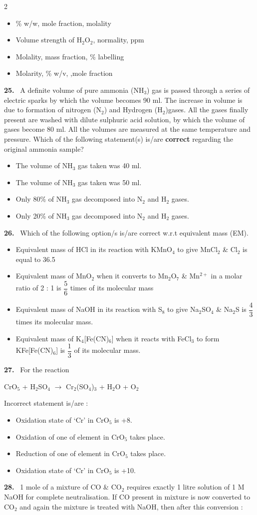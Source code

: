 \documentclass[10pt]{extarticle}
\newcommand{\qn}[1]{\par\smallskip\noindent\textbf{#1.}~}
\newenvironment{qoptions}{\begin{itemize}[leftmargin=1.8em,itemsep=1pt,topsep=2pt,label={}]}{\end{itemize}}
\newcommand{\opt}[2]{\item[(#1)] #2}
\begin{document}
\begin{multicols}{2}
\begin{qoptions}
\opt{A}{\% w/w, mole fraction, molality}
\opt{B}{Volume strength of H$_2$O$_2$, normality, ppm}
\opt{C}{Molality, mass fraction, \% labelling}
\opt{D}{Molarity, \% w/v, ,mole fraction}
\end{qoptions}
\qn{25} A definite volume of pure ammonia (NH$_3$) gas is passed through a series of electric sparks by which the volume becomes 90 ml. The increase in volume is due to formation of nitrogen (N$_2$) and Hydrogen (H$_2$)gases. All the gases finally present are washed with dilute sulphuric acid solution, by which the volume of gases become 80 ml. All the volumes are measured at the same temperature and pressure. Which of the following statement(s) is/are \textbf{correct} regarding the original ammonia sample?
\begin{qoptions}
\opt{A}{The volume of NH$_3$ gas taken was 40 ml.}
\opt{B}{The volume of NH$_3$ gas taken was 50 ml.}
\opt{C}{Only 80\% of NH$_3$ gas decomposed into N$_2$ and H$_2$ gases.}
\opt{D}{Only 20\% of NH$_3$ gas decomposed into N$_2$ and H$_2$ gases.}
\end{qoptions}
\qn{26} Which of the following option/s is/are correct w.r.t equivalent mass (EM).
\begin{qoptions}
\opt{A}{Equivalent mass of HCl in its reaction with KMnO$_4$ to give MnCl$_2$ \& Cl$_2$ is equal to 36.5}
\opt{B}{Equivalent mass of MnO$_2$ when it converts to Mn$_2$O$_7$ \& Mn$^{2+}$ in a molar ratio of 2 : 1 is $\dfrac56$ times of its molecular mass}
\opt{C}{Equivalent mass of NaOH in its reaction with S$_8$ to give Na$_2$SO$_4$ \& Na$_2$S is $\dfrac43$ times its molecular mass.}
\opt{D}{Equivalent mass of K$_4$[Fe(CN)$_6$] when it reacts with FeCl$_3$ to form KFe[Fe(CN)$_6$] is $\dfrac13$ of its molecular mass.}
\end{qoptions}
\qn{27} For the reaction\par
CrO$_5$ + H$_2$SO$_4$ $\longrightarrow$ Cr$_2$(SO$_4$)$_3$ + H$_2$O + O$_2$\par
Incorrect statement is/are :
\begin{qoptions}
\opt{A}{Oxidation state of `Cr' in CrO$_5$ is +8.}
\opt{B}{Oxidation of one of element in CrO$_5$ takes place.}
\opt{C}{Reduction of one of element in CrO$_5$ takes place.}
\opt{D}{Oxidation state of `Cr' in CrO$_5$ is +10.}
\end{qoptions}
\qn{28} 1 mole of a mixture of CO \& CO$_2$ requires exactly 1 litre solution of 1 M NaOH for complete neutralisation. If CO present in mixture is now converted to CO$_2$ and again the mixture is treated with NaOH, then after this conversion :

\end{multicols}
\end{document}
